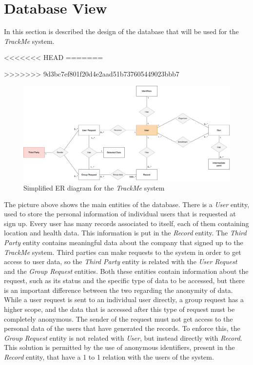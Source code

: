 \section{Database View}

In this section is described the design of the database that will be used for the \textit{TrackMe} system. 

<<<<<<< HEAD
=======

>>>>>>> 9d3bc7ef801f20d4e2aad51b737605449023bbb7
\begin{figure}[H]
\includegraphics[scale=0.27,keepaspectratio]{DD/Pictures/ER-diagram.png}
\centering
\caption{Simplified ER diagram for the \textit{TrackMe} system}
\end{figure}

The picture above shows the main entities of the database. There is a \textit{User} entity, used to store the personal information of individual users that is requested at sign up. Every user has many records associated to itself, each of them containing location and health data. This information is put in the \textit{Record} entity. The \textit{Third Party} entity contains meaningful data about the company that signed up to the \textit{TrackMe} system. Third parties can make requests to the system in order to get access to user data, so the \textit{Third Party} entity is related with the \textit{User Request} and the \textit{Group Request} entities. Both these entities contain information about the request, such as its status and the specific type of data to be accessed, but there is an important difference between the two regarding the anonymity of data. While a user request is sent to an individual user directly, a group request has a higher scope, and the data that 
is accessed after this type of request must be completely anonymous. The sender of the request must not get access to the personal data of the users that have generated the records. To enforce this, the \textit{Group Request} entity is not related with \textit{User}, but instead directly with \textit{Record}. This solution is permitted by the use of anonymous identifiers, present in the \textit{Record} entity, that have a 1 to 1 relation with the users of the system.


